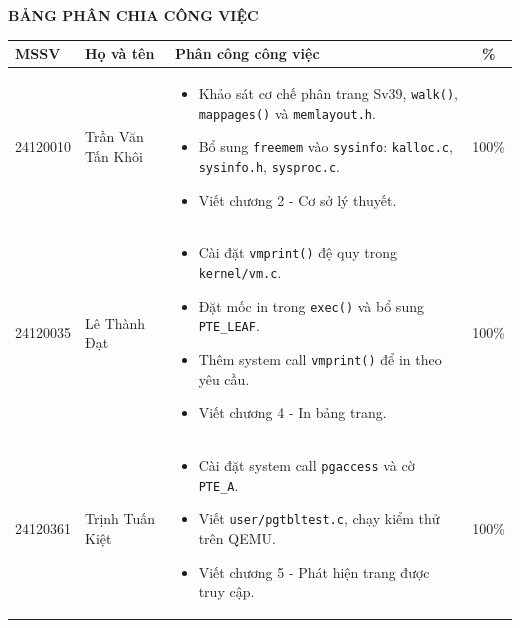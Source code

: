 \newpage

\thispagestyle{empty}

\begin{center}
    \Large\textbf{BẢNG PHÂN CHIA CÔNG VIỆC}
\end{center}

\begin{table}[H]
    \centering
    \renewcommand{\arraystretch}{1.3}
    \setlength{\tabcolsep}{6pt}
    \setlength{\arrayrulewidth}{1pt}

    \begin{tabularx}{\textwidth}{|p{2cm}|p{4cm}|X|c|}
        \hline
        \rowcolor[rgb]{0.8, 0.9, 1.0}
        \textbf{MSSV} & \textbf{Họ và tên} & \textbf{Phân công công việc} & \textbf{\%} \\ \hline

        24120010 & Trần Văn Tấn Khôi &
        \vspace{-0.5\baselineskip}
        \begin{itemize}[itemsep=0pt, topsep=0pt, partopsep=0pt, parsep=0pt]
            \item Khảo sát cơ chế phân trang Sv39, \texttt{walk()}, \texttt{mappages()} và \texttt{memlayout.h}.
            \item Bổ sung \texttt{freemem} vào \texttt{sysinfo}: \texttt{kalloc.c}, \texttt{sysinfo.h}, \texttt{sysproc.c}.
            \item Viết chương 2 - Cơ sở lý thuyết.
        \end{itemize} & 100\% \\ \hline

        24120035 & Lê Thành Đạt &
        \vspace{-0.5\baselineskip}
        \begin{itemize}[itemsep=0pt, topsep=0pt, partopsep=0pt, parsep=0pt]
            \item Cài đặt \texttt{vmprint()} đệ quy trong \texttt{kernel/vm.c}.
            \item Đặt mốc in trong \texttt{exec()} và bổ sung \texttt{PTE\_LEAF}.
            \item Thêm system call \texttt{vmprint()} để in theo yêu cầu.
            \item Viết chương 4 - In bảng trang.
        \end{itemize} & 100\% \\ \hline

        24120361 & Trịnh Tuấn Kiệt &
        \vspace{-0.5\baselineskip}
        \begin{itemize}[itemsep=0pt, topsep=0pt, partopsep=0pt, parsep=0pt]
            \item Cài đặt system call \texttt{pgaccess} và cờ \texttt{PTE\_A}.
            \item Viết \texttt{user/pgtbltest.c}, chạy kiểm thử trên QEMU.
            \item Viết chương 5 - Phát hiện trang được truy cập.
        \end{itemize} & 100\% \\ \hline
    \end{tabularx}
\end{table}
